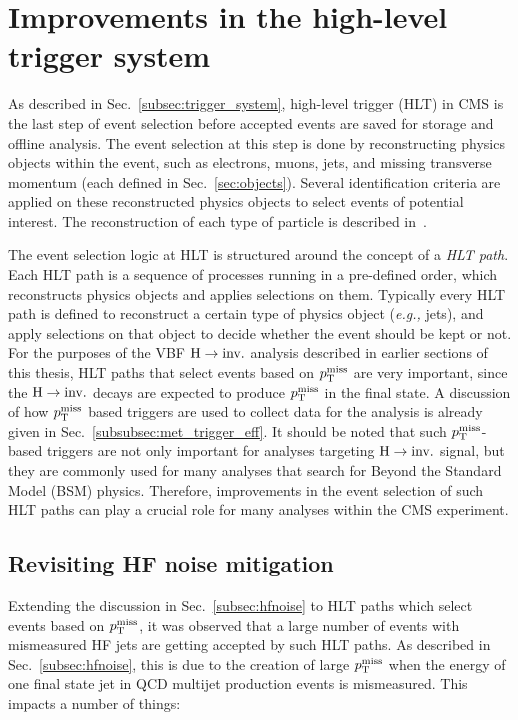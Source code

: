\section{Improvements in the high-level trigger system}

\graphicspath{{5_Outlook/Figures}}

As described in Sec.~\ref{subsec:trigger_system}, high-level trigger (HLT) in CMS is the last step of event selection before accepted events are saved for storage
and offline analysis.
The event selection at this step is done by reconstructing physics objects within the event, such as electrons, muons, jets, 
and missing transverse momentum (each defined in Sec.~\ref{sec:objects}).
Several identification criteria are applied on these reconstructed physics objects to select events of potential interest. The reconstruction of each
type of particle is described in~\cite{cms:hlt_paper}.

The event selection logic at HLT is structured around the concept of a \textit{HLT path}. Each HLT path is a sequence of processes running in a pre-defined order, which
reconstructs physics objects and applies selections on them. Typically every HLT path is defined to reconstruct a certain type of physics object (\textit{e.g.,} jets), and apply
selections on that object to decide whether the event should be kept or not. For the purposes of the VBF $\textrm{H} \rightarrow \textrm{inv.}$ analysis described in earlier sections of this thesis,
HLT paths that select events based on $p_{\textrm{T}}^{\textrm{miss}}$ are very important, since the $\textrm{H} \rightarrow \textrm{inv.}$ decays are expected to produce $p_{\textrm{T}}^{\textrm{miss}}$ in the final state. A discussion of how
$p_{\textrm{T}}^{\textrm{miss}}$ based triggers are used to collect data for the analysis is already given in Sec.~\ref{subsubsec:met_trigger_eff}. It should be noted that such $p_{\textrm{T}}^{\textrm{miss}}$-based triggers
are not only important for analyses targeting $\textrm{H} \rightarrow \textrm{inv.}$ signal, but they are commonly used for many analyses that search for Beyond the Standard Model (BSM) physics. Therefore,
improvements in the event selection of such HLT paths can play a crucial role for many analyses within the CMS experiment.

\subsection{Revisiting HF noise mitigation}
\label{subsec:hf_noise_hlt}

Extending the discussion in Sec.~\ref{subsec:hfnoise} to HLT paths which select events based on $p_{\textrm{T}}^{\textrm{miss}}$, 
it was observed that a large number of events with mismeasured HF jets are getting accepted by such HLT paths. 
As described in Sec.~\ref{subsec:hfnoise}, this is due to the creation of large $p_{\textrm{T}}^{\textrm{miss}}$ when the energy of one final state jet in QCD multijet
production events is mismeasured. This impacts a number of things:

